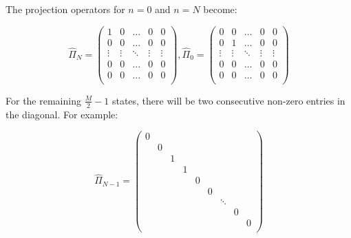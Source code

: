 The projection operators for $n=0$ and $n=N$ become:

\begin{equation}
\hat{\Pi}_{N} = \begin{pmatrix} 
1 & 0 &... & 0 & 0 \\
0 & 0 & ... & 0 & 0 \\
\vdots & \vdots & \ddots & \vdots & \vdots \\
0 & 0 & ... & 0 & 0 \\
0 & 0 & ... & 0 & 0 \\
\end{pmatrix} , 
\hat{\Pi}_{0} = \begin{pmatrix} 
0 & 0 &... & 0 & 0 \\
0 & 1 & ... & 0 & 0 \\
\vdots & \vdots & \ddots & \vdots & \vdots \\
0 & 0 & ... & 0 & 0 \\
0 & 0 & ... & 0 & 0 \\
\end{pmatrix}
\end{equation}

For the remaining $\frac{M}{2} - 1$ states, there will be two consecutive non-zero entries in the diagonal. For example:

\begin{equation}
\hat{\Pi}_{N-1} = \begin{pmatrix} 
0 \\
& 0 \\
& & 1 \\
& & & 1 \\
& & & &  0 \\
& & & & & 0 \\
& & & & &  & \ddots \\
& & & & & & &  0 \\
& & & & & & & &  0 \\
\end{pmatrix}
\end{equation}

